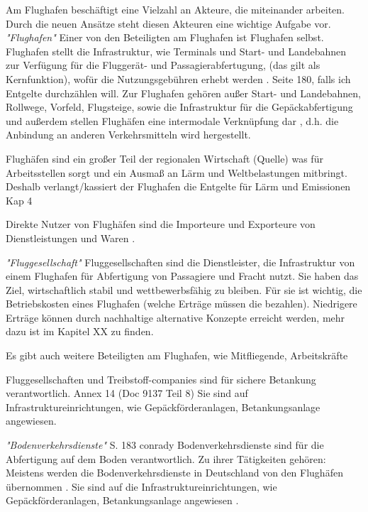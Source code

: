 Am Flughafen beschäftigt eine Vielzahl an Akteure, die miteinander arbeiten. Durch die neuen Ansätze steht diesen Akteuren eine 
wichtige Aufgabe vor.
\textit{"Flughafen"}
Einer von den Beteiligten am Flughafen ist Flughafen selbst. 
Flughafen stellt die Infrastruktur, wie Terminals und Start- und Landebahnen zur Verfügung für die Fluggerät- und Passagierabfertugung, 
(das gilt als Kernfunktion), wofür die Nutzungsgebühren erhebt werden \cite{conrady2019luftverkehr}. Seite 180, falls ich Entgelte durchzählen will.
Zur Flughafen gehören außer Start- und Landebahnen, Rollwege, Vorfeld, Flugsteige, sowie die Infrastruktur für die Gepäckabfertigung und 
außerdem stellen Flughäfen eine intermodale Verknüpfung dar \cite{conrady2019luftverkehr}, d.h. die Anbindung an anderen Verkehrsmitteln wird hergestellt.

Flughäfen sind ein großer Teil der regionalen Wirtschaft (Quelle) was für Arbeitsstellen sorgt und ein Ausmaß an Lärm und Weltbelastungen mitbringt.
Deshalb verlangt/kassiert der Flughafen die Entgelte für Lärm und Emissionen Kap 4

Direkte Nutzer von Flughäfen sind die Importeure und Exporteure von Dienstleistungen und Waren \cite{schaar2010analysis}. 

\textit{"Fluggesellschaft"}
Fluggesellschaften sind die Dienstleister, die Infrastruktur von einem Flughafen für Abfertigung von Passagiere und Fracht nutzt. 
Sie haben das Ziel, wirtschaftlich stabil und wettbewerbsfähig zu bleiben. Für sie ist wichtig, die Betriebskosten 
eines Flughafen \cite{schaar2010analysis} (welche Erträge müssen die bezahlen). Niedrigere Erträge können durch nachhaltige 
alternative Konzepte erreicht werden, mehr dazu ist im Kapitel XX zu finden.

Es gibt auch weitere Beteiligten am Flughafen, wie Mitfliegende, Arbeitskräfte

Fluggesellschaften und Treibstoff-companies sind für sichere Betankung verantwortlich. Annex 14 (Doc 9137 Teil 8)
Sie sind auf Infrastruktureinrichtungen, wie Gepäckförderanlagen, Betankungsanlage angewiesen.

\textit{"Bodenverkehrsdienste"} S. 183 conrady
Bodenverkehrsdienste sind für die Abfertigung auf dem Boden verantwortlich. Zu ihrer Tätigkeiten gehören: 
Meistens werden die Bodenverkehrsdienste in Deutschland von den Flughäfen übernommen \cite{conrady2019luftverkehr}.
Sie sind auf die Infrastruktureinrichtungen, wie Gepäckförderanlagen, Betankungsanlage angewiesen \cite{conrady2019luftverkehr}.

